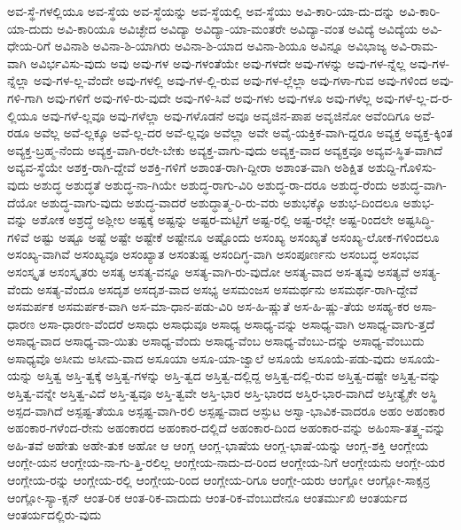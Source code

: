 {ಅವ-ಸ್ಥೆ-ಗಳಲ್ಲಿಯೂ
ಅವ-ಸ್ಥೆಯ
ಅವ-ಸ್ಥೆಯನ್ನು
ಅವ-ಸ್ಥೆಯಲ್ಲಿ
ಅವ-ಸ್ಥೆಯು
ಅವಿ-ಕಾರಿ-ಯಾ-ದು-ದನ್ನು
ಅವಿ-ಕಾರಿ-ಯಾ-ದುದು
ಅವಿ-ಕಾರಿಯೂ
ಅವಿಚ್ಛೇದ
ಅವಿದ್ಯಾ
ಅವಿದ್ಯಾ-ಯಾ-ಮಂತರೇ
ಅವಿದ್ಯಾ-ವಂತ
ಅವಿದ್ಯೆ
ಅವಿದ್ಯೆಯ
ಅವಿ-ಧೇಯ-ರಿಗೆ
ಅವಿನಾಶಿ
ಅವಿನಾ-ಶಿ-ಯಾಗಿರು
ಅವಿನಾ-ಶಿ-ಯಾದ
ಅವಿನಾ-ಶಿಯೂ
ಅವಿನ್ನೂ
ಅವಿಭಾಜ್ಯ
ಅವಿ-ರಾಮ-ವಾಗಿ
ಅವಿರ್ಭವಿಸು-ವುದು
ಅವು
ಅವು-ಗಳ
ಅವು-ಗಳಂತೆಯೇ
ಅವು-ಗಳದೇ
ಅವು-ಗಳನ್ನು
ಅವು-ಗಳ-ನ್ನೆಲ್ಲ
ಅವು-ಗಳ-ನ್ನೆಲ್ಲಾ
ಅವು-ಗಳ-ಲ್ಲ-ವೆಂದೇ
ಅವು-ಗಳಲ್ಲಿ
ಅವು-ಗಳ-ಲ್ಲಿ-ರುವ
ಅವು-ಗಳ-ಲ್ಲೆಲ್ಲಾ
ಅವು-ಗಳಾ-ಗುವ
ಅವು-ಗಳಿಂದ
ಅವು-ಗಳಿ-ಗಾಗಿ
ಅವು-ಗಳಿಗೆ
ಅವು-ಗಳಿ-ರು-ವುದೇ
ಅವು-ಗಳಿ-ಸಿವೆ
ಅವು-ಗಳು
ಅವು-ಗಳೂ
ಅವು-ಗಳೆಲ್ಲ
ಅವು-ಗಳೆ-ಲ್ಲ-ದ-ರ-ಲ್ಲಿಯೂ
ಅವು-ಗಳೆ-ಲ್ಲವೂ
ಅವು-ಗಳೆಲ್ಲಾ
ಅವು-ಗಳೊಡನೆ
ಅವೂ
ಅವೃಜಿನ-ಪಾಪ
ಅವೃಜಿನೋ
ಅವೆಂದಿಗೂ
ಅವೆ-ರಡೂ
ಅವೆಲ್ಲ
ಅವೆ-ಲ್ಲಕ್ಕೂ
ಅವೆ-ಲ್ಲ-ದರ
ಅವೆ-ಲ್ಲವೂ
ಅವೆಲ್ಲಾ
ಅವೇ
ಅವೈ-ಯಕ್ತಿಕ-ವಾಗಿ-ದ್ದರೂ
ಅವ್ಯಕ್ತ
ಅವ್ಯಕ್ತ-ಕ್ಕಿಂತ
ಅವ್ಯಕ್ತ-ಬ್ರಹ್ಮ-ನೆಂದು
ಅವ್ಯಕ್ತ-ವಾಗಿ-ರಲೇ-ಬೇಕು
ಅವ್ಯಕ್ತ-ವಾಗು-ವುದು
ಅವ್ಯಕ್ತ-ವಾದ
ಅವ್ಯಕ್ತವೂ
ಅವ್ಯವ-ಸ್ಥಿತ-ವಾಗಿದೆ
ಅವ್ಯವ-ಸ್ಥೆಯೇ
ಅಶಕ್ತ-ರಾಗಿ-ದ್ದೇವೆ
ಅಶಕ್ತಿ-ಗಳಿಗೆ
ಅಶಾಂತ-ರಾಗಿ-ದ್ದೀರಾ
ಅಶಾಂತ-ವಾಗಿ
ಅಶಿಕ್ಷಿತ
ಅಶುದ್ದಿ-ಗೊಳಿಸು-ವುದು
ಅಶುದ್ಧ
ಅಶುದ್ಧತೆ
ಅಶುದ್ಧ-ನಾ-ಗಿಯೇ
ಅಶುದ್ಧ-ರಾಗು-ವಿರಿ
ಅಶುದ್ಧ-ರಾ-ದರೂ
ಅಶುದ್ಧ-ರೆಂದು
ಅಶುದ್ಧ-ವಾಗಿ-ದೆಯೋ
ಅಶುದ್ಧ-ವಾಗು-ವುದು
ಅಶುದ್ಧ-ವಾದರೆ
ಅಶುದ್ಧಾತ್ಮ-ರಿ-ರು-ವರು
ಅಶುಭಕ್ಕೊ
ಅಶುಭ-ದಿಂದಲೂ
ಅಶುಭ-ವನ್ನು
ಅಶೋಕ
ಅಶ್ರದ್ಧೆ
ಅಶ್ಲೀಲ
ಅಷ್ಟಕ್ಕೆ
ಅಷ್ಟನ್ನು
ಅಷ್ಟರ-ಮಟ್ಟಿಗೆ
ಅಷ್ಟ-ರಲ್ಲಿ
ಅಷ್ಟ-ರಲ್ಲೇ
ಅಷ್ಟ-ರಿಂದಲೇ
ಅಷ್ಟಸಿದ್ಧಿ-ಗಳಿವೆ
ಅಷ್ಟು
ಅಷ್ಟೂ
ಅಷ್ಟೆ
ಅಷ್ಟೇ
ಅಷ್ಟೇಕೆ
ಅಷ್ಟೇನೂ
ಅಷ್ಟೊಂದು
ಅಸಂಖ್ಯ
ಅಸಂಖ್ಯತೆ
ಅಸಂಖ್ಯ-ಲೋಕ-ಗಳಿಂದಲೂ
ಅಸಂಖ್ಯ-ವಾಗಿವೆ
ಅಸಂಖ್ಯವೂ
ಅಸಂಖ್ಯಾತ
ಅಸಂತುಷ್ಟ
ಅಸಂದಿಗ್ಧ-ವಾಗಿ
ಅಸಂಪೂರ್ಣನು
ಅಸಂಬದ್ಧ
ಅಸಂಭವ
ಅಸಂಸ್ಕೃತ
ಅಸಂಸ್ಕೃತರು
ಅಸತ್ಯ
ಅಸತ್ಯ-ವನ್ನೂ
ಅಸತ್ಯ-ವಾಗಿ-ರು-ವುದೋ
ಅಸತ್ಯ-ವಾದ
ಅಸ-ತ್ಯವು
ಅಸತ್ಯವೆ
ಅಸತ್ಯ-ವೆಂದು
ಅಸತ್ಯ-ವೆಂದೂ
ಅಸದೃಶ
ಅಸದೃಶ-ವಾದ
ಅಸಭ್ಯ
ಅಸಮಂಜಸ
ಅಸಮರ್ಥನು
ಅಸಮರ್ಥ-ರಾಗಿ-ದ್ದೇವೆ
ಅಸಮರ್ಪಕ
ಅಸಮರ್ಪಕ-ವಾಗಿ
ಅಸ-ಮಾ-ಧಾನ-ಪಡು-ವಿರಿ
ಅಸ-ಹಿ-ಷ್ಣುತೆ
ಅಸ-ಹಿ-ಷ್ಣು-ತೆಯ
ಅಸಹ್ಯ-ಕರ
ಅಸಾ-ಧಾರಣ
ಅಸಾ-ಧಾರಣ-ವೆಂದರೆ
ಅಸಾಧು
ಅಸಾಧುವೂ
ಅಸಾಧ್ಯ
ಅಸಾಧ್ಯ-ವನ್ನು
ಅಸಾಧ್ಯ-ವಾಗಿ
ಅಸಾಧ್ಯ-ವಾಗು-ತ್ತದೆ
ಅಸಾಧ್ಯ-ವಾದ
ಅಸಾಧ್ಯ-ವಾ-ಯಿತು
ಅಸಾಧ್ಯ-ವೆಂದು
ಅಸಾಧ್ಯ-ವೆಂಬ
ಅಸಾಧ್ಯ-ವೆಂಬು-ದನ್ನು
ಅಸಾಧ್ಯ-ವೆಂಬುದು
ಅಸಾಧ್ಯವೊ
ಅಸೀಮ
ಅಸೀಮ-ವಾದ
ಅಸೂಯಾ
ಅಸೂ-ಯಾ-ಜ್ವಾಲೆ
ಅಸೂಯೆ
ಅಸೂಯೆ-ಪಡು-ವುದು
ಅಸೂಯೆ-ಯನ್ನು
ಅಸ್ತಿತ್ವ
ಅಸ್ತಿ-ತ್ವಕ್ಕೆ
ಅಸ್ತಿತ್ವ-ಗಳನ್ನು
ಅಸ್ತಿ-ತ್ವದ
ಅಸ್ತಿತ್ವ-ದಲ್ಲಿದ್ದ
ಅಸ್ತಿತ್ವ-ದಲ್ಲಿ-ರುವ
ಅಸ್ತಿತ್ವ-ದಷ್ಟೇ
ಅಸ್ತಿತ್ವ-ವನ್ನು
ಅಸ್ತಿತ್ವ-ವನ್ನೇ
ಅಸ್ತಿತ್ವ-ವಿದೆ
ಅಸ್ತಿ-ತ್ವವೂ
ಅಸ್ತಿ-ತ್ವವೇ
ಅಸ್ತಿ-ಭಾರ
ಅಸ್ತಿ-ಭಾರದ
ಅಸ್ತಿರ-ಭಾರ-ವಾಗಿದೆ
ಅಸ್ತೀತ್ಯೈಕೇ
ಅಸ್ಥಿ
ಅಸ್ಪದ-ವಾಗಿದೆ
ಅಸ್ಪಷ್ಟ-ತೆಯೂ
ಅಸ್ಪಷ್ಟ-ವಾಗಿ-ರಲಿ
ಅಸ್ಪಷ್ಟ-ವಾದ
ಅಸ್ಫುಟ
ಅಸ್ವಾ-ಭಾವಿಕ-ವಾದರೂ
ಅಹಂ
ಅಹಂಕಾರ
ಅಹಂಕಾರ-ಗಳೆಂದ-ರೇನು
ಅಹಂಕಾರದ
ಅಹಂಕಾರ-ದಲ್ಲಿದೆ
ಅಹಂಕಾರ-ದಿಂದ
ಅಹಂಕಾರ-ವನ್ನು
ಅಹಿಂಸಾ-ತತ್ತ್ವ-ವನ್ನು
ಅಹಿ-ತವೆ
ಅಹೇತು
ಅಹೇ-ತುಕ
ಅಹೋ
ಆ
ಆಂಗ್ಲ
ಆಂಗ್ಲ-ಭಾಷೆಯ
ಆಂಗ್ಲ-ಭಾಷೆ-ಯನ್ನು
ಆಂಗ್ಲ-ಶಕ್ತಿ
ಆಂಗ್ಲೇಯ
ಆಂಗ್ಲೇ-ಯನ
ಆಂಗ್ಲೇಯ-ನಾ-ಗು-ತ್ತಿ-ರಲಿಲ್ಲ
ಆಂಗ್ಲೇಯ-ನಾದು-ದ-ರಿಂದ
ಆಂಗ್ಲೇಯ-ನಿಗೆ
ಆಂಗ್ಲೇಯನು
ಆಂಗ್ಲೇ-ಯರ
ಆಂಗ್ಲೇಯ-ರನ್ನು
ಆಂಗ್ಲೇಯ-ರಲ್ಲಿ
ಆಂಗ್ಲೇಯ-ರಿಂದ
ಆಂಗ್ಲೇಯ-ರಿಗೂ
ಆಂಗ್ಲೇ-ಯರು
ಆಂಗ್ಲೋ
ಆಂಗ್ಲೋ-ಸಾಕ್ಸನ್ರ
ಆಂಗ್ಲೋ-ಸ್ಯಾ-ಕ್ಸನ್
ಆಂತ-ರಿಕ
ಆಂತ-ರಿಕ-ವಾದುದು
ಆಂತ-ರಿಕ-ವೆಂಬುದೇನೂ
ಆಂತರ್ಮುಖಿ
ಆಂತರ್ಯದ
ಆಂತರ್ಯದಲ್ಲಿರು-ವುದು
}
